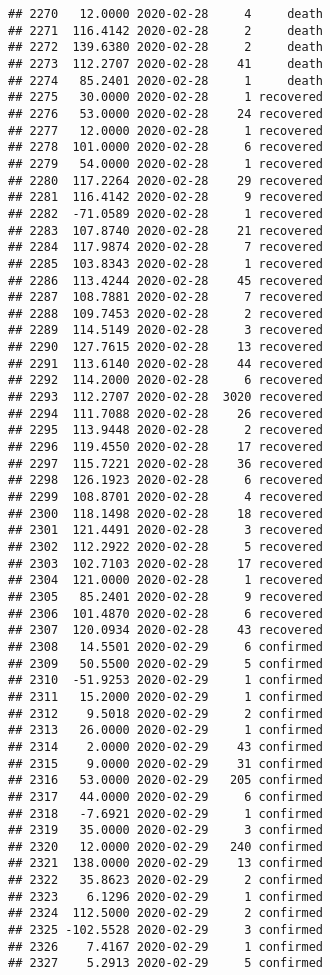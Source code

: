 \documentclass[
]{article}
\begin{document}
\begin{verbatim}
## 2270   12.0000 2020-02-28     4     death
## 2271  116.4142 2020-02-28     2     death
## 2272  139.6380 2020-02-28     2     death
## 2273  112.2707 2020-02-28    41     death
## 2274   85.2401 2020-02-28     1     death
## 2275   30.0000 2020-02-28     1 recovered
## 2276   53.0000 2020-02-28    24 recovered
## 2277   12.0000 2020-02-28     1 recovered
## 2278  101.0000 2020-02-28     6 recovered
## 2279   54.0000 2020-02-28     1 recovered
## 2280  117.2264 2020-02-28    29 recovered
## 2281  116.4142 2020-02-28     9 recovered
## 2282  -71.0589 2020-02-28     1 recovered
## 2283  107.8740 2020-02-28    21 recovered
## 2284  117.9874 2020-02-28     7 recovered
## 2285  103.8343 2020-02-28     1 recovered
## 2286  113.4244 2020-02-28    45 recovered
## 2287  108.7881 2020-02-28     7 recovered
## 2288  109.7453 2020-02-28     2 recovered
## 2289  114.5149 2020-02-28     3 recovered
## 2290  127.7615 2020-02-28    13 recovered
## 2291  113.6140 2020-02-28    44 recovered
## 2292  114.2000 2020-02-28     6 recovered
## 2293  112.2707 2020-02-28  3020 recovered
## 2294  111.7088 2020-02-28    26 recovered
## 2295  113.9448 2020-02-28     2 recovered
## 2296  119.4550 2020-02-28    17 recovered
## 2297  115.7221 2020-02-28    36 recovered
## 2298  126.1923 2020-02-28     6 recovered
## 2299  108.8701 2020-02-28     4 recovered
## 2300  118.1498 2020-02-28    18 recovered
## 2301  121.4491 2020-02-28     3 recovered
## 2302  112.2922 2020-02-28     5 recovered
## 2303  102.7103 2020-02-28    17 recovered
## 2304  121.0000 2020-02-28     1 recovered
## 2305   85.2401 2020-02-28     9 recovered
## 2306  101.4870 2020-02-28     6 recovered
## 2307  120.0934 2020-02-28    43 recovered
## 2308   14.5501 2020-02-29     6 confirmed
## 2309   50.5500 2020-02-29     5 confirmed
## 2310  -51.9253 2020-02-29     1 confirmed
## 2311   15.2000 2020-02-29     1 confirmed
## 2312    9.5018 2020-02-29     2 confirmed
## 2313   26.0000 2020-02-29     1 confirmed
## 2314    2.0000 2020-02-29    43 confirmed
## 2315    9.0000 2020-02-29    31 confirmed
## 2316   53.0000 2020-02-29   205 confirmed
## 2317   44.0000 2020-02-29     6 confirmed
## 2318   -7.6921 2020-02-29     1 confirmed
## 2319   35.0000 2020-02-29     3 confirmed
## 2320   12.0000 2020-02-29   240 confirmed
## 2321  138.0000 2020-02-29    13 confirmed
## 2322   35.8623 2020-02-29     2 confirmed
## 2323    6.1296 2020-02-29     1 confirmed
## 2324  112.5000 2020-02-29     2 confirmed
## 2325 -102.5528 2020-02-29     3 confirmed
## 2326    7.4167 2020-02-29     1 confirmed
## 2327    5.2913 2020-02-29     5 confirmed

\end{verbatim}
\end{document}

